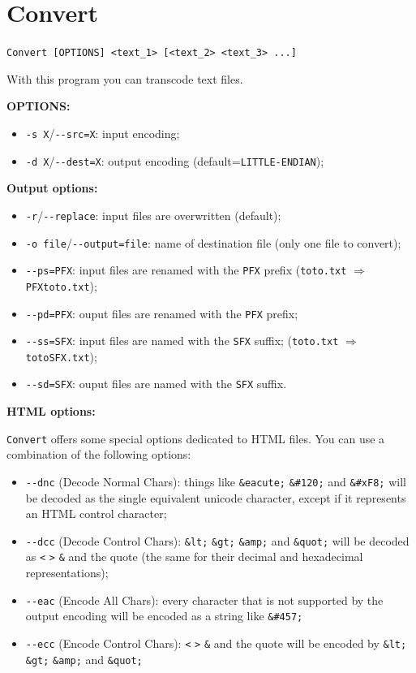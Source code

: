 \section{Convert}
\verb+Convert [OPTIONS] <text_1> [<text_2> <text_3> ...]+

\bigskip
\noindent With this program you can transcode text files.

\bigskip
\noindent \textbf{OPTIONS:}
\begin{itemize}
  \item \verb+-s X+/\verb+--src=X+: input encoding;
  \item \verb+-d X+/\verb+--dest=X+: output encoding
  (default=\verb$LITTLE-ENDIAN$);
\end{itemize}

\bigskip
\noindent \textbf{Output options:}
\begin{itemize}
  \item \verb+-r+/\verb+--replace+: input files are overwritten (default);
  \item \verb+-o file+/\verb+--output=file+: name of destination file (only one file to convert);
  \item \verb+--ps=PFX+: input files are renamed with the \verb+PFX+ prefix
        (\verb+toto.txt+ $\Rightarrow$ \verb+PFXtoto.txt+);
  \item \verb+--pd=PFX+: ouput files are renamed with the \verb+PFX+ prefix;
  \item \verb+--ss=SFX+: input files are named with the \verb+SFX+ suffix;
        (\verb+toto.txt+ $\Rightarrow$ \verb+totoSFX.txt+);
  \item \verb+--sd=SFX+: ouput files are named with the \verb+SFX+ suffix.
\end{itemize}

\bigskip
\noindent \textbf{HTML options:}

\noindent \verb+Convert+ offers some special options dedicated to HTML files. You can 
use a combination of the following options:

\begin{itemize}
  \item \verb+--dnc+ (Decode Normal Chars): things like \verb+&eacute;+
  \verb+&#120;+ and \verb+&#xF8;+ will be decoded as the single equivalent 
  unicode character, except if it represents an HTML control character;
  
  \item \verb+--dcc+ (Decode Control Chars): \verb+&lt;+ \verb+&gt;+
  \verb+&amp;+ and \verb+&quot;+ will be decoded as \verb+<+ \verb+>+
  \verb+&+ and the quote (the same for their decimal and hexadecimal
  representations);
  
  \item \verb+--eac+ (Encode All Chars): every character that is not supported by
  the output encoding will be encoded as a string like \verb+&#457;+
  
  \item \verb+--ecc+ (Encode Control Chars): \verb+<+ \verb+>+
  \verb+&+ and the quote will be encoded by \verb+&lt;+ \verb+&gt;+
  \verb+&amp;+ and \verb+&quot;+
\end{itemize} 

